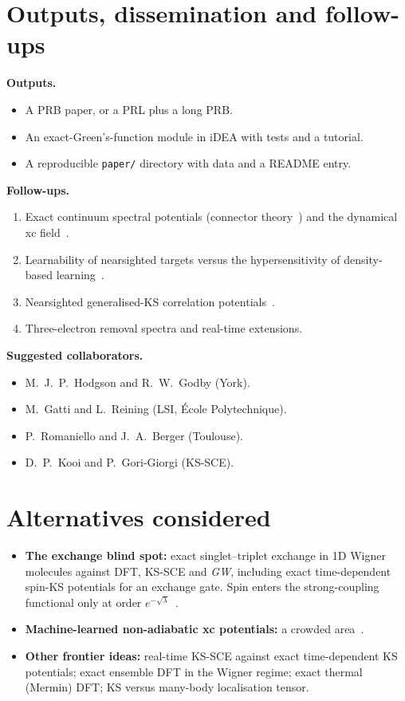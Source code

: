 \documentclass[11pt,a4paper]{article}
\newcommand{\GW}{\textit{GW}}
\newcommand{\iDEA}{iDEA}
\newcommand{\code}[1]{\texttt{#1}}
\begin{document}
\section{Outputs, dissemination and follow-ups}
\textbf{Outputs.}
\begin{itemize}
\item A PRB paper, or a PRL plus a long PRB.
\item An exact-Green's-function module in \iDEA{} with tests and a tutorial.
\item A reproducible \code{paper/} directory with data and a README entry.
\end{itemize}

\textbf{Follow-ups.}
\begin{enumerate}
\item Exact continuum spectral potentials (connector theory~\cite{gatti2007,vanzini2022,vanzini2018}) and the dynamical xc field~\cite{aryasetiawan2025}.
\item Learnability of nearsighted targets versus the hypersensitivity of density-based learning~\cite{arnstein2026}.
\item Nearsighted generalised-KS correlation potentials~\cite{hodgson2020}.
\item Three-electron removal spectra and real-time extensions.
\end{enumerate}

\textbf{Suggested collaborators.}
\begin{itemize}
\item M.~J.~P.~Hodgson and R.~W.~Godby (York).
\item M.~Gatti and L.~Reining (LSI, \'Ecole Polytechnique).
\item P.~Romaniello and J.~A.~Berger (Toulouse).
\item D.~P.~Kooi and P.~Gori-Giorgi (KS-SCE).
\end{itemize}

\section{Alternatives considered}
\begin{itemize}
\item \textbf{The exchange blind spot:} exact singlet--triplet exchange in 1D Wigner molecules against DFT, KS-SCE and \GW, including exact time-dependent spin-KS potentials for an exchange gate. Spin enters the strong-coupling functional only at order $e^{-\sqrt\lambda}$~\cite{grossi2017}.
\item \textbf{Machine-learned non-adiabatic xc potentials:} a crowded area~\cite{bhat2026}.
\item \textbf{Other frontier ideas:} real-time KS-SCE against exact time-dependent KS potentials; exact ensemble DFT in the Wigner regime; exact thermal (Mermin) DFT; KS versus many-body localisation tensor.
\end{itemize}
\end{document}
